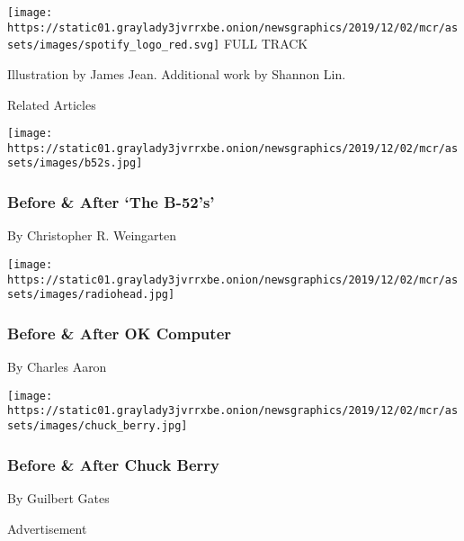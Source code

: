 \href{https://open.spotify.com/track/1rNSLiEFpAF4amVhkzfTUG?si=8eHuN9-zQiGE81GQ1VtBWg}{}

\texttt{[image: https://static01.graylady3jvrrxbe.onion/newsgraphics/2019/12/02/mcr/assets/images/spotify\_logo\_red.svg]}
FULL TRACK

Illustration by James Jean. Additional work by Shannon Lin.

Related Articles

\href{https://www.nytimes3xbfgragh.onion/interactive/2019/07/15/arts/music/b52s-influences-playlist.html}{}

\texttt{[image: https://static01.graylady3jvrrxbe.onion/newsgraphics/2019/12/02/mcr/assets/images/b52s.jpg]}

\hypertarget{before--after-the-b-52s}{%
\subsubsection{Before \& After `The
B-52's'}\label{before--after-the-b-52s}}

By Christopher R. Weingarten

\href{https://www.nytimes3xbfgragh.onion/interactive/2017/06/23/arts/music/radiohead-ok-computer-influences-playlist.html}{}

\texttt{[image: https://static01.graylady3jvrrxbe.onion/newsgraphics/2019/12/02/mcr/assets/images/radiohead.jpg]}

\hypertarget{before--after-ok-computer}{%
\subsubsection{Before \& After OK
Computer}\label{before--after-ok-computer}}

By Charles Aaron

\href{https://www.nytimes3xbfgragh.onion/interactive/2017/03/26/arts/music/before-and-after-chuck-berry-rock-n-roll.html}{}

\texttt{[image: https://static01.graylady3jvrrxbe.onion/newsgraphics/2019/12/02/mcr/assets/images/chuck\_berry.jpg]}

\hypertarget{before--after-chuck-berry}{%
\subsubsection{Before \& After Chuck
Berry}\label{before--after-chuck-berry}}

By Guilbert Gates

Advertisement

